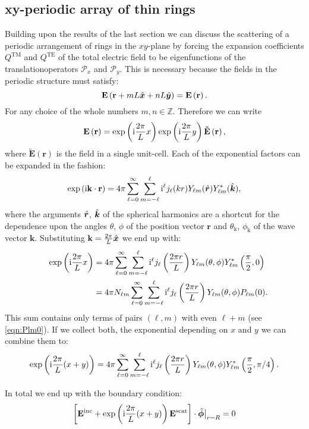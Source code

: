 \subsection{xy-periodic array of thin rings}
Building upon the results of the last section we can discuss the scattering of a periodic arrangement of rings in the $xy$-plane by forcing the expansion coefficients $Q^\text{TM}$ and $Q^\text{TE}$ of the total electric field to be eigenfunctions of the translationoperators $\mathcal{P}_x$ and $\mathcal{P}_y$. This is necessary because the fields in the periodic structure must satisfy:
\begin{equation}
\mathbf{E}\left(\mathbf{r}+m L \hat{\bm{x}}+
n L \hat{\bm{y}}\right)=
\mathbf{E}\left(\mathbf{r}\right).
\end{equation}
For any choice of the whole numbers $m, n\in \mathbb{Z}$. Therefore we can write
\begin{equation}
\mathbf{E}\left(\mathbf{r}\right) = 
\exp\left(\mathrm{i} \frac{2\pi}{L}x\right) \exp\left(\mathrm{i} \frac{2\pi}{L}y\right)\mathbf{\tilde{E}}\left(\mathbf{r}\right),
\end{equation}
where $\mathbf{\tilde{E}}(\mathbf{r})$ is the field in a single unit-cell. Each of the exponential factors can be expanded in the fashion:
\begin{equation}
\exp\left(\mathrm{i}\mathbf{k}\cdot \mathbf{r}\right) = 4\pi \sum_{\ell=0}^\infty \sum_{m=-\ell}^\ell
\mathrm{i}^\ell j_\ell(kr) Y_{\ell m}(\hat{\bm{r}}) Y_{\ell m}^*(\hat{\bm{k}}),
\end{equation}
where the arguments $\hat{\bm{r}}$, $\hat{\bm{k}}$ of the spherical harmonics are a shortcut for the dependence upon the angles $\theta$, $\phi$ of the position vector $\mathbf{r}$ and $\theta_\mathrm{k}$, $\phi_\mathrm{k}$ of the wave vector $\mathbf{k}$. Substituting $\mathbf{k}=\frac{2\pi}{L}\hat{\bm{x}}$ we end up with:
\begin{align}
&& \nonumber
\exp\left(\mathrm{i} \frac{2\pi}{L} x\right) &= 4\pi \sum_{\ell=0}^\infty \sum_{m=-\ell}^\ell
\mathrm{i}^\ell j_\ell\left(\frac{2\pi r}{L}\right) Y_{\ell m}(\theta, \phi) Y_{\ell m}^*\left(\frac{\pi}{2}, 0\right) \\
&& &= 4\pi N_{\ell m} \sum_{\ell=0}^\infty \sum_{m=-\ell}^\ell
\mathrm{i}^\ell j_\ell\left(\frac{2\pi r}{L}\right) Y_{\ell m}(\theta, \phi)
P_{\ell m}(0).
\label{eqn:xperiodicity}
\end{align}
This sum contains only terms of pairs $(\ell,m)$ with even $\ell+m$ (see \cref{eqn:Plm0}). If we collect both, the exponential depending on $x$ and $y$ we can combine them to:
\begin{equation}
\exp\left(\mathrm{i} \frac{2\pi}{L} (x+y)\right) = 4\pi \sum_{\ell=0}^\infty \sum_{m=-\ell}^\ell
\mathrm{i}^\ell j_\ell\left(\frac{2\pi r}{L}\right) Y_{\ell m}(\theta, \phi) Y_{\ell m}^*\left(\frac{\pi}{2}, \pi/4\right).
\end{equation}

In total we end up with the boundary condition:
\begin{equation}
\left[\mathbf{E}^\text{inc}+\exp\left(\mathrm{i} \frac{2\pi}{L}(x+y)\right)\mathbf{E}^\text{scat}\right] \cdot \hat{\bm{\phi}}\big|_{r=R} = 0
\end{equation}